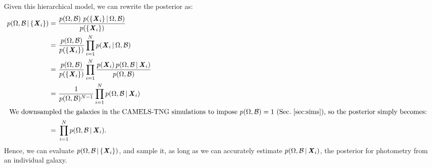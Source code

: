 Given this hierarchical model, we can rewrite the posterior as: 
\begin{align}
p(\Omega, \mathcal{B} \,|\, \{{\textbf{\textit{X}}_i}\}) 
    =&~\frac{p(\Omega, \mathcal{B})~p(\{{\textbf{\textit{X}}_i}\} \,|\, \Omega,
    \mathcal{B})}{p(\{{\textbf{\textit{X}}_i}\})}\\
    =&~\frac{p(\Omega, \mathcal{B})}{p(\{\textbf{\textit{X}}_i\})}\prod\limits_{i=1}^N 
    p({\textbf{\textit{X}}_i}\,|\, \Omega, \mathcal{B})\\
    =&~\frac{p(\Omega, \mathcal{B})}{p(\{\textbf{\textit{X}}_i\})}\prod\limits_{i=1}^N 
    \frac{p(\textbf{\textit{X}}_i)\,p(\Omega, \mathcal{B}\,|\,{\textbf{\textit{X}}_i})}{p(\Omega,
    \mathcal{B})}\\
    =&~\frac{1}{p(\Omega, \mathcal{B})^{N-1}}\prod\limits_{i=1}^N p(\Omega,
    \mathcal{B}\,|\, {\textbf{\textit{X}}_i})\\
\intertext{
    We downsampled the galaxies in the CAMELS-TNG simulations to impose 
    $p(\Omega, \mathcal{B}) = 1$ (Sec.~\ref{sec:sims}), so the posterior
    simply becomes:}
    \label{eq:posterior}
    =&~\prod\limits_{i=1}^N p(\Omega, \mathcal{B}\,|\, {\textbf{\textit{X}}_i}).
\end{align} 
Hence, we can evaluate $p(\Omega, \mathcal{B} \,|\, \{{\textbf{\textit{X}}_i}\})$, and
sample it, as long as we can accurately estimate $p(\Omega, \mathcal{B}\,|\,
{\textbf{\textit{X}}_i})$, the posterior for photometry from an individual galaxy. 

